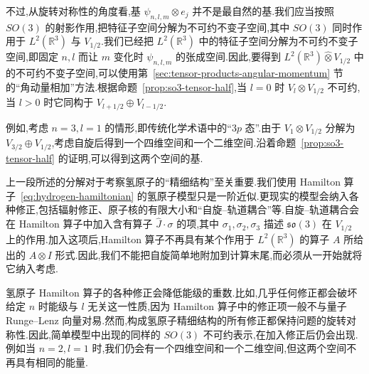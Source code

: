 {不过,从旋转对称性的角度看,基 $\psi_{n,l,m}\otimes e_j$ 并不是最自然的基.我们应当按照 $SO(3)$ 的射影作用,把特征子空间分解为不可约不变子空间,其中 $SO(3)$ 同时作用于 $L^2(\mathbb R^3)$ 与 $V_{1/2}$.我们已经把 $L^2(\mathbb R^3)$ 中的特征子空间分解为不可约不变子空间,即固定 $n,l$ 而让 $m$ 变化时 $\psi_{n,l,m}$ 的张成空间.因此,要得到 $L^2(\mathbb R^3)\widehat\otimes V_{1/2}$ 中的不可约不变子空间,可以使用第~\ref{sec:tensor-products-angular-momentum} 节的“角动量相加”方法.根据命题~\ref{prop:so3-tensor-half},当 $l=0$ 时 $V_l\otimes V_{1/2}$ 不可约,当 $l>0$ 时它同构于 $V_{l+1/2}\oplus V_{l-1/2}$.

例如,考虑 $n=3,l=1$ 的情形,即传统化学术语中的“$3p$ 态”.由于 $V_1\otimes V_{1/2}$ 分解为 $V_{3/2}\oplus V_{1/2}$,考虑自旋后得到一个四维空间和一个二维空间.沿着命题~\ref{prop:so3-tensor-half} 的证明,可以得到这两个空间的基.

上一段所述的分解对于考察氢原子的“精细结构”至关重要.我们使用 Hamilton 算子~\eqref{eq:hydrogen-hamiltonian} 的氢原子模型只是一阶近似.更现实的模型会纳入各种修正,包括辐射修正、原子核的有限大小和“自旋--轨道耦合”等.自旋--轨道耦合会在 Hamilton 算子中加入含有算子 $\widehat J\cdot\sigma$ 的项,其中 $\sigma_1,\sigma_2,\sigma_3$ 描述 $\mathfrak{so}(3)$ 在 $V_{1/2}$ 上的作用.加入这项后,Hamilton 算子不再具有某个作用于 $L^2(\mathbb R^3)$ 的算子 $A$ 所给出的 $A\otimes I$ 形式.因此,我们不能把自旋简单地附加到计算末尾,而必须从一开始就将它纳入考虑.

氢原子 Hamilton 算子的各种修正会降低能级的重数.比如,几乎任何修正都会破坏给定 $n$ 时能级与 $l$ 无关这一性质,因为 Hamilton 算子中的修正项一般不与量子 Runge--Lenz 向量对易.然而,构成氢原子精细结构的所有修正都保持问题的旋转对称性.因此,简单模型中出现的同样的 $SO(3)$ 不可约表示,在加入修正后仍会出现.例如当 $n=2,l=1$ 时,我们仍会有一个四维空间和一个二维空间,但这两个空间不再具有相同的能量.

}


